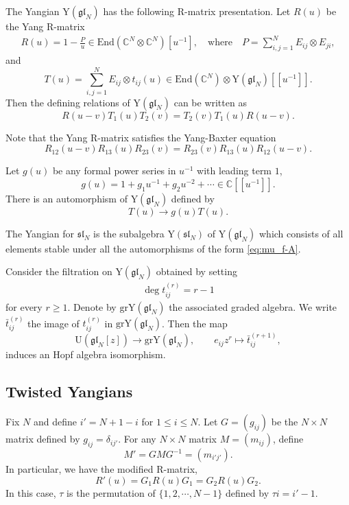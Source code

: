 \documentclass[11pt,reqno]{amsart}
\numberwithin{equation}{section}
\theoremstyle{definition}
\theoremstyle{remark}
\newcommand{\beq}{\begin{equation}}
\newcommand{\eeq}{\end{equation}}
\newcommand{\be}{\begin{equation*}}
\newcommand{\ee}{\end{equation*}}
\newcommand{\bC}{\mathbb{C}}
\newcommand{\gl}{\mathfrak{gl}}
\newcommand{\rY}{\mathrm{Y}}
\newcommand{\End}{\mathrm{End}}
\newcommand{\gge}{\geqslant}
\newcommand{\lle}{\leqslant}
\begin{document}
The Yangian $\rY(\gl_N)$ has the following R-matrix presentation. Let $R(u)$ be the Yang R-matrix
\begin{align} \label{Ru}
R(u)=1-\frac{P}{u}\in \End(\bC^N\otimes \bC^N)[u^{-1}],\quad \text{where} \quad P=\sum_{i,j=1}^N E_{ij}\otimes E_{ji},
\end{align}
and
\[
T(u)=\sum_{i,j=1}^N E_{ij}\otimes t_{ij}(u)\in \End(\bC^N)\otimes\rY(\gl_N)[[u^{-1}]]. 
\]
Then the defining relations of $\rY(\gl_N)$ can be written as
\be
R(u-v)T_1(u)T_2(v)=T_2(v)T_1(u)R(u-v).
\ee

Note that the Yang R-matrix satisfies the Yang-Baxter equation
\beq\label{ybeq}
R_{12}(u-v)R_{13}(u)R_{23}(v)=R_{23}(v)R_{13}(u)R_{12}(u-v).
\eeq

Let $g(u)$ be any formal power series in $u^{-1}$ with leading term $1$,
\[
g(u)=1+g_1u^{-1}+g_2u^{-2}+\cdots\in \bC[[u^{-1}]].
\]
There is an automorphism of $\rY(\gl_N)$ defined by
\beq\label{eq:mu_f-A}
T(u)\to g(u)T(u).
\eeq

The Yangian for $\mathfrak{sl}_N$ is the subalgebra $\rY(\mathfrak{sl}_N)$ of $\rY(\gl_N)$ which consists of all elements stable under all the automorphisms of the form \eqref{eq:mu_f-A}.

Consider the filtration on $\rY(\gl_N)$ obtained by setting
\begin{align}  \label{filter:Y}
\deg t_{ij}^{(r)}=r-1
\end{align}
for every $r\gge 1$. Denote by $\mathrm{gr}\rY(\gl_N)$ the associated graded algebra. We write $\bar t_{ij}^{(r)}$ the image of $t_{ij}^{(r)}$ in $\mathrm{gr}\rY(\gl_N)$. Then the map
\beq\label{eq:cl-limitA}
\mathrm{U}(\gl_N[z])\to \mathrm{gr}\rY(\gl_N), \qquad e_{ij} z^{r}\mapsto \bar t_{ij}^{(r+1)},
\eeq
induces an Hopf algebra isomorphism.  

\subsection{Twisted Yangians}\label{subsec:tY}
Fix $N$ and define $i'=N+1-i$ for $1\lle i\lle N$. Let $G=(g_{ij})$ be the $N\times N$ matrix defined by $g_{ij}=\delta_{ij'}$. For any $N\times N$ matrix $M=(m_{ij})$, define
\beq\label{mat'}
M'=G M G^{-1}=(m_{i'j'}).
\eeq
In particular, we have the modified R-matrix,
\beq\label{twistedR}
R'(u)=G_1R(u)G_1=G_2R(u)G_2.
\eeq
In this case, $\tau$ is the permutation of $\{1,2,\cdots,N-1\}$ defined by $\tau i=i'-1$.
\end{document}
